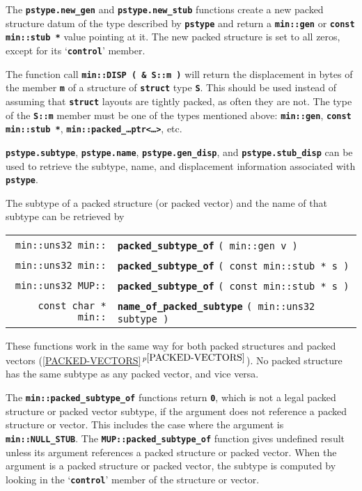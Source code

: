 \documentclass[12pt]{article}
\makeatletter
\newcommand{\TT}[1]{{\tt \bfseries #1}}
\newcommand{\ttindex}[1]{\index{#1@{\tt #1}}}
\newcommand{\itemref}[1]{\ref{#1}$\,^{p\pageref{#1}}$}
\newcommand{\EOL}{\penalty \exhyphenpenalty}
\newenvironment{indpar}[1][0.3in]%
	{\begin{list}{}%
		     {\setlength{\itemsep}{0in}%
		      \setlength{\topsep}{0in}%
		      \setlength{\parsep}{1ex}%
		      \setlength{\labelwidth}{#1}%
		      \setlength{\leftmargin}{#1}%
		      \addtolength{\leftmargin}{\labelsep}}%
	 \item}%
	{\end{list}}
\newcommand{\LABEL}[1]{\label{#1}}
\newcommand{\MINKEY}[1]%
	   {\TT{#1}\ttindex{min::#1}\ttindex{#1}}
\newcommand{\MUPKEY}[1]%
	   {\TT{#1}\ttindex{MUP::#1}\ttindex{#1}}
\makeatother
\begin{document}
The \TT{pstype.new\_gen} and \TT{pstype.new\_stub}
functions create a new packed structure
datum of the type described by \TT{pstype} and return a
\TT{min::gen} or \TT{const min::\EOL stub~*} value pointing at it.
The new packed structure is set to all zeros, except for its
`\TT{control}' member.

The function call \TT{min::\EOL DISP~(~\&~S::m~)} will return the
displacement in bytes of the member \TT{m} of a structure
of \TT{struct} type \TT{S}.  This should be used instead of
assuming that \TT{struct} layouts are tightly packed, as often
they are not.  The type of the \TT{S::m} member must be one of
the types mentioned above: \TT{min::gen}, \TT{const min::stub~*},
\TT{min::\EOL packed\_\EOL \ldots{}ptr<\ldots>}, etc.

\TT{pstype.subtype}, \TT{pstype.name},
\TT{pstype.gen\_\EOL disp},
and \TT{pstype.stub\_\EOL disp}
can be used to retrieve the subtype, name, and displacement
information associated with \TT{pstype}.

The subtype of a packed structure (or packed vector)
and the name of that subtype can be retrieved by

\begin{indpar}\begin{tabular}{r@{}l}
\verb|min::uns32 min::|
	& \MINKEY{packed\_subtype\_of} \verb|( min::gen v )|
\LABEL{MIN::PACKED_STRUCT_SUBTYPE_OF_GEN} \\
\verb|min::uns32 min::|
	& \MINKEY{packed\_subtype\_of} \verb|( const min::stub * s )|
\LABEL{MIN::PACKED_STRUCT_SUBTYPE_OF_STUB} \\
\verb|min::uns32 MUP::|
	& \MUPKEY{packed\_subtype\_of} \verb|( const min::stub * s )|
\LABEL{MUP::PACKED_STRUCT_SUBTYPE_OF_STUB} \\
\verb|const char * min::|
	& \MINKEY{name\_of\_packed\_subtype} \verb|( min::uns32 subtype )|
\LABEL{MIN::NAME_OF_PACKED_SUBTYPE} \\
\end{tabular}\end{indpar}

These functions work in the same way for both packed structures
and packed vectors (\itemref{PACKED-VECTORS}).
No packed structure has the same subtype as any packed vector, and
vice versa.

The \TT{min::\EOL packed\_\EOL subtype\_\EOL of}
functions return \TT{0}, which
is not a legal packed structure or packed vector subtype, if the
argument does not reference a packed structure or vector.  This includes
the case where the argument is \TT{min::\EOL NULL\_\EOL STUB}.
The \TT{MUP::\EOL packed\_\EOL subtype\_\EOL of} function gives
undefined result unless its argument references a packed structure
or packed vector.  When the argument is a packed structure
or packed vector,
the subtype is computed by looking in the
`\TT{control}' member of the structure or vector.
\end{document}
